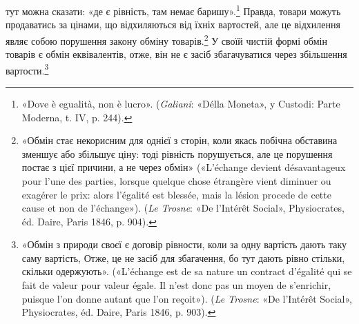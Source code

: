 \parcont{}  %
тут можна сказати: «де є рівність, там немає баришу».\footnote{
«Dove è egualità, non è lucro». (\emph{Galiani}: «Délla Moneta», y Custodi:
Parte Moderna, t. IV, p. 244).
} Правда,
товари можуть продаватись за цінами, що відхиляються від їхніх
вартостей, але це відхилення являє собою порушення закону
обміну товарів.\footnote{
«Обмін стає некорисним для однієї з сторін, коли якась побічна
обставина зменшує або збільшує ціну: тоді рівність порушується, але це
порушення постає з цієї причини, а не через обмін» («L’échange devient
désavantageux pour l’une des parties, lorsque quelque chose étrangère vient
diminuer ou exagérer le prix: alors l’égalité est blessée, mais la lésion procede
de cette cause et non de l’échange»). (\emph{Le Trosne}: «De l’Intérêt Social»,
Physiocrates, éd. Daire, Paris 1846, p. 904).
} У своїй чистій формі обмін товарів є обмін
еквівалентів, отже, він не є засіб збагачуватися через збільшення
вартости.\footnote{
«Обмін з природи своєї є договір рівности, коли за одну вартість
дають таку саму вартість, Отже, це не засіб для збагачення, бо тут
дають рівно стільки, скільки одержують». («L’échange est de sa nature
un contract d’égalité qui se fait de valeur pour valeur égale. Il n’est
donc pas un moyen de s’enrichir, puisque l’on donne autant que l’on
reçoit»). (\emph{Le Trosne}: «De l’Intérêt Social», Physiocrates, éd. Daire, Paris
1846, p. 903).
}

